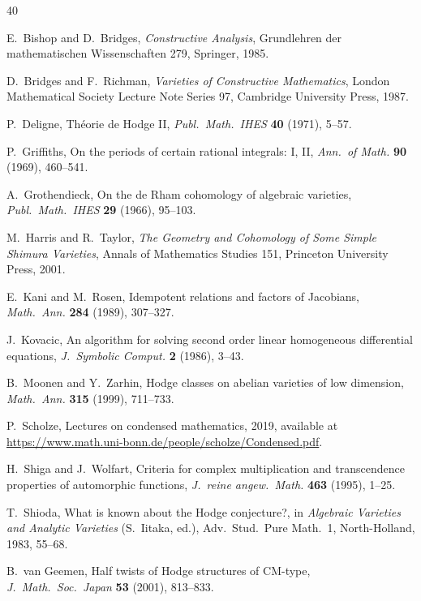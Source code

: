 \documentclass[11pt]{article}
\theoremstyle{plain}
\theoremstyle{definition}
\theoremstyle{remark}
\begin{document}
\begin{thebibliography}{40}

E.~Bishop and D.~Bridges,
\emph{Constructive Analysis},
Grundlehren der mathematischen Wissenschaften 279,
Springer, 1985.

D.~Bridges and F.~Richman,
\emph{Varieties of Constructive Mathematics},
London Mathematical Society Lecture Note Series 97,
Cambridge University Press, 1987.

P.~Deligne,
Th\'eorie de Hodge II,
\emph{Publ.\ Math.\ IHES} \textbf{40} (1971), 5--57.

P.~Griffiths,
On the periods of certain rational integrals: I, II,
\emph{Ann.\ of Math.} \textbf{90} (1969), 460--541.

A.~Grothendieck,
On the de Rham cohomology of algebraic varieties,
\emph{Publ.\ Math.\ IHES} \textbf{29} (1966), 95--103.

M.~Harris and R.~Taylor,
\emph{The Geometry and Cohomology of Some Simple Shimura Varieties},
Annals of Mathematics Studies 151,
Princeton University Press, 2001.

E.~Kani and M.~Rosen,
Idempotent relations and factors of Jacobians,
\emph{Math.\ Ann.} \textbf{284} (1989), 307--327.

J.~Kovacic,
An algorithm for solving second order linear homogeneous
differential equations,
\emph{J.\ Symbolic Comput.} \textbf{2} (1986), 3--43.

B.~Moonen and Y.~Zarhin,
Hodge classes on abelian varieties of low dimension,
\emph{Math.\ Ann.} \textbf{315} (1999), 711--733.

P.~Scholze,
Lectures on condensed mathematics,
2019, available at
\url{https://www.math.uni-bonn.de/people/scholze/Condensed.pdf}.

H.~Shiga and J.~Wolfart,
Criteria for complex multiplication and transcendence properties
of automorphic functions,
\emph{J.\ reine angew.\ Math.} \textbf{463} (1995), 1--25.

T.~Shioda,
What is known about the Hodge conjecture?,
in \emph{Algebraic Varieties and Analytic Varieties}
(S.~Iitaka, ed.), Adv.\ Stud.\ Pure Math.\ 1,
North-Holland, 1983, 55--68.

B.~van Geemen,
Half twists of Hodge structures of CM-type,
\emph{J.\ Math.\ Soc.\ Japan} \textbf{53} (2001), 813--833.


\end{thebibliography}
\end{document}
